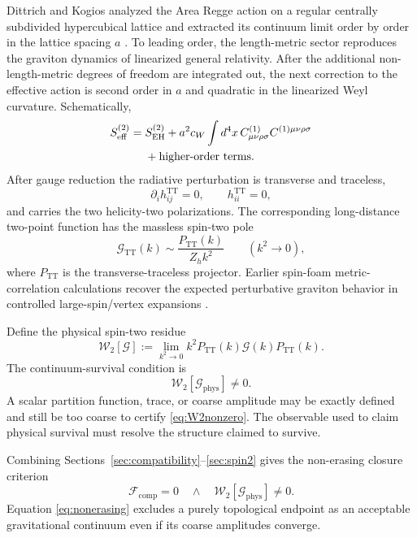 \documentclass[aps,prd,reprint,nofootinbib,superscriptaddress]{revtex4-2}
\newcommand{\phys}{\mathrm{phys}}
\newcommand{\TT}{\mathrm{TT}}
\begin{document}
Dittrich and Kogios analyzed the Area Regge action on a regular centrally subdivided hypercubical lattice and extracted its continuum limit order by order in the lattice spacing $a$ \cite{DittrichKogios2023}. To leading order, the length-metric sector reproduces the graviton dynamics of linearized general relativity. After the additional non-length-metric degrees of freedom are integrated out, the next correction to the effective action is second order in $a$ and quadratic in the linearized Weyl curvature. Schematically,
\begin{align}
S_{\mathrm{eff}}^{(2)}
={}&
S_{\mathrm{EH}}^{(2)}
+a^2c_W\int d^4x\,
C^{(1)}_{\mu\nu\rho\sigma}
C^{(1)\mu\nu\rho\sigma}
\notag\\
&+\text{higher-order terms}.
\label{eq:Seff}
\end{align}
After gauge reduction the radiative perturbation is transverse and traceless,
\begin{equation}
\partial_i h_{ij}^{\TT}=0,
\qquad
h_{ii}^{\TT}=0,
\label{eq:TT}
\end{equation}
and carries the two helicity-two polarizations. The corresponding long-distance two-point function has the massless spin-two pole
\begin{equation}
\mathcal G_{\TT}(k)
\sim
\frac{P_{\TT}(k)}{Z_hk^2}
\qquad(k^2\to0),
\label{eq:gravitonpole}
\end{equation}
where $P_{\TT}$ is the transverse-traceless projector. Earlier spin-foam metric-correlation calculations recover the expected perturbative graviton behavior in controlled large-spin/vertex expansions \cite{BianchiMagliaroPerini2009}.

Define the physical spin-two residue
\begin{equation}
\boxed{
\mathcal W_2[\mathcal G]
:=
\lim_{k^2\to0}
 k^2P_{\TT}(k)
 \mathcal G(k)
 P_{\TT}(k).
}
\label{eq:W2}
\end{equation}
The continuum-survival condition is
\begin{equation}
\boxed{
\mathcal W_2[\mathcal G_{\phys}]\neq0.
}
\label{eq:W2nonzero}
\end{equation}
A scalar partition function, trace, or coarse amplitude may be exactly defined and still be too coarse to certify \eqref{eq:W2nonzero}. The observable used to claim physical survival must resolve the structure claimed to survive.

Combining Sections~\ref{sec:compatibility}--\ref{sec:spin2} gives the non-erasing closure criterion
\begin{equation}
\boxed{
\mathcal F_{\mathrm{comp}}=0
\quad\land\quad
\mathcal W_2[\mathcal G_{\phys}]\neq0.
}
\label{eq:nonerasing}
\end{equation}
Equation \eqref{eq:nonerasing} excludes a purely topological endpoint as an acceptable gravitational continuum even if its coarse amplitudes converge.
\end{document}

